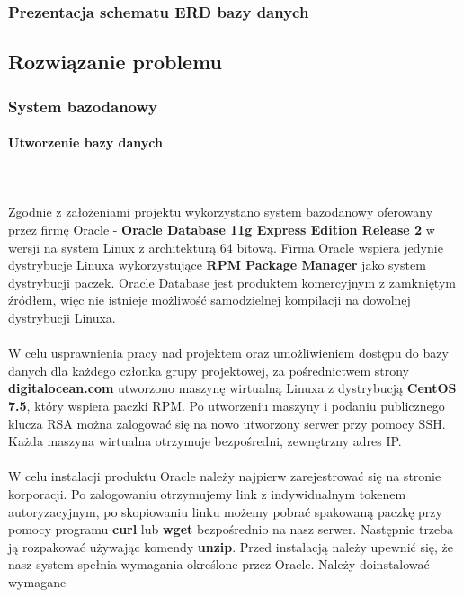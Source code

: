 \documentclass[polish, 11pt]{article}
\begin{document}
	    \subsubsection{Prezentacja schematu ERD bazy danych}
		    

    \subsection{Rozwiązanie problemu}
	    \subsubsection{System bazodanowy}
		    \paragraph{Utworzenie bazy danych}\mbox{}\\\\
			    Zgodnie z założeniami projektu wykorzystano system bazodanowy oferowany przez firmę Oracle - 
			    {\bfseries Oracle Database 11g Express Edition Release 2} w wersji na system Linux z architekturą 64 bitową.
			    Firma Oracle wspiera jedynie dystrybucje Linuxa wykorzystujące {\bfseries RPM Package Manager} jako system dystrybucji paczek.
			    Oracle Database jest produktem komercyjnym z zamkniętym źródłem, więc nie istnieje możliwość samodzielnej kompilacji
			    na dowolnej dystrybucji Linuxa.\\\\
			    W celu usprawnienia pracy nad projektem oraz umożliwieniem dostępu do bazy danych dla każdego członka grupy projektowej,
			    za pośrednictwem strony {\bfseries digitalocean.com} utworzono maszynę wirtualną Linuxa z dystrybucją {\bfseries CentOS 7.5},
			    który wspiera paczki RPM. Po utworzeniu maszyny i podaniu publicznego klucza RSA można zalogować się na nowo utworzony serwer
			    przy pomocy SSH. Każda maszyna wirtualna otrzymuje bezpośredni, zewnętrzny adres IP.\\\\
			    W celu instalacji produktu Oracle należy najpierw zarejestrować się na stronie korporacji. Po zalogowaniu otrzymujemy link
			    z indywidualnym tokenem autoryzacyjnym, po skopiowaniu linku możemy pobrać spakowaną paczkę przy pomocy programu 
			    {\bfseries curl} lub {\bfseries wget} bezpośrednio na nasz serwer. Następnie trzeba ją rozpakować używając komendy {\bfseries unzip}.
			    Przed instalacją należy upewnić się, że nasz system spełnia wymagania określone przez Oracle. Należy doinstalować wymagane
\end{document}
